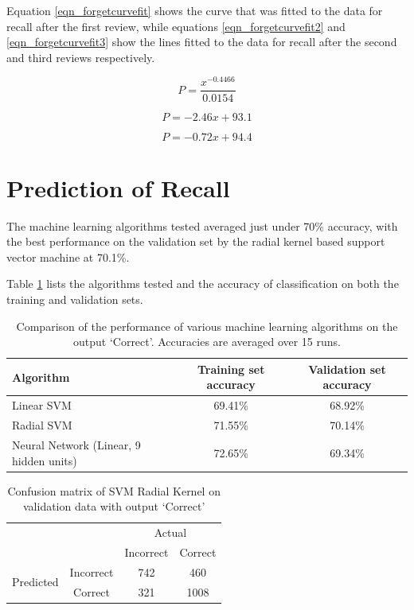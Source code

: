 Equation \ref{eqn_forgetcurvefit} shows the curve that was fitted to the data for recall
after the first review, while equations \ref{eqn_forgetcurvefit2} and \ref{eqn_forgetcurvefit3}
show the lines fitted to the data for recall after the second and third reviews respectively.

\begin{equation}
\label{eqn_forgetcurvefit}
P = \frac{x^{-0.4466}}{0.0154}
\end{equation}

\begin{equation}
\label{eqn_forgetcurvefit2}
P = -2.46x + 93.1
\end{equation}

\begin{equation}
\label{eqn_forgetcurvefit3}
P = -0.72x + 94.4
\end{equation}

\section{Prediction of Recall}

The machine learning algorithms tested averaged just under 70\% accuracy, with
the best performance on the validation set by the radial kernel based support vector
machine at 70.1\%.

Table \ref{tbl_algo_comparison} lists the algorithms tested and the accuracy of
classification on both the training and validation sets.

\begin{table}[h!]
\caption{Comparison of the performance of various machine learning algorithms on the output `Correct'. Accuracies are averaged over 15 runs.}
\label{tbl_algo_comparison}
\begin{tabular}{|p{5cm}|c|c|}
\hline
Algorithm & Training set accuracy & Validation set accuracy \\
\hline
Linear SVM & 69.41\% & 68.92\% \\
Radial SVM & 71.55\% & 70.14\% \\
Neural Network (Linear, 9 hidden units) & 72.65\% & 69.34\% \\
\hline
\end{tabular}
\end{table}

\begin{table}[h!]
\caption{Confusion matrix of SVM Radial Kernel on validation data with output `Correct'}
\label{tbl_confusionmatrix_correct}
\begin{tabular}{|cc|cc|}
\hline
& & \multicolumn{2}{|c|}{Actual} \\
 & & Incorrect & Correct \\
\hline
\multirow{2}{*}{Predicted} & Incorrect & 742 & 460 \\
& Correct & 321 & 1008 \\
\hline
\end{tabular}
\end{table}

